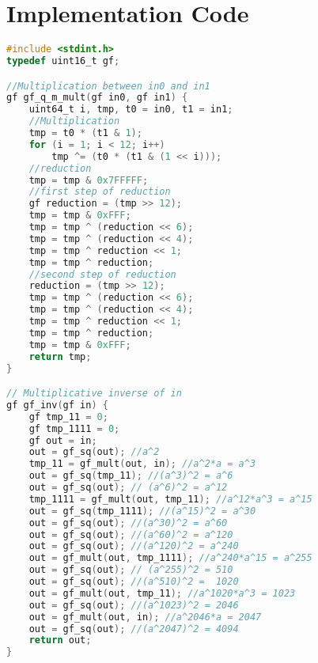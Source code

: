 \documentclass[brazil, english]{ufsc-thesis}
\begin{document}
\postextual


\appendix
\chapter{Implementation Code}\label{ch:imp-remarks}
\begin{lstlisting}[caption={Multiplication of two elements in $\mathbb{F}_{2^{12}}$ and inversion of an element in $\mathbb{F}_{2^{12}}$},label={lst:label},language=C]
#include <stdint.h>
typedef uint16_t gf;

//Multiplication between in0 and in1
gf gf_q_m_mult(gf in0, gf in1) {
    uint64_t i, tmp, t0 = in0, t1 = in1;
    //Multiplication
    tmp = t0 * (t1 & 1);
    for (i = 1; i < 12; i++)
        tmp ^= (t0 * (t1 & (1 << i)));
    //reduction
    tmp = tmp & 0x7FFFFF;
    //first step of reduction
    gf reduction = (tmp >> 12);
    tmp = tmp & 0xFFF;
    tmp = tmp ^ (reduction << 6);
    tmp = tmp ^ (reduction << 4);
    tmp = tmp ^ reduction << 1;
    tmp = tmp ^ reduction;
    //second step of reduction
    reduction = (tmp >> 12);
    tmp = tmp ^ (reduction << 6);
    tmp = tmp ^ (reduction << 4);
    tmp = tmp ^ reduction << 1;
    tmp = tmp ^ reduction;
    tmp = tmp & 0xFFF;
    return tmp;
}

// Multiplicative inverse of in
gf gf_inv(gf in) {
    gf tmp_11 = 0;
    gf tmp_1111 = 0;
    gf out = in;
    out = gf_sq(out); //a^2
    tmp_11 = gf_mult(out, in); //a^2*a = a^3
    out = gf_sq(tmp_11); //(a^3)^2 = a^6
    out = gf_sq(out); // (a^6)^2 = a^12
    tmp_1111 = gf_mult(out, tmp_11); //a^12*a^3 = a^15
    out = gf_sq(tmp_1111); //(a^15)^2 = a^30
    out = gf_sq(out); //(a^30)^2 = a^60
    out = gf_sq(out); //(a^60)^2 = a^120
    out = gf_sq(out); //(a^120)^2 = a^240
    out = gf_mult(out, tmp_1111); //a^240*a^15 = a^255
    out = gf_sq(out); // (a^255)^2 = 510
    out = gf_sq(out); //(a^510)^2 =  1020
    out = gf_mult(out, tmp_11); //a^1020*a^3 = 1023
    out = gf_sq(out); //(a^1023)^2 = 2046
    out = gf_mult(out, in); //a^2046*a = 2047
    out = gf_sq(out); //(a^2047)^2 = 4094
    return out;
}
\end{lstlisting}
\end{document}
